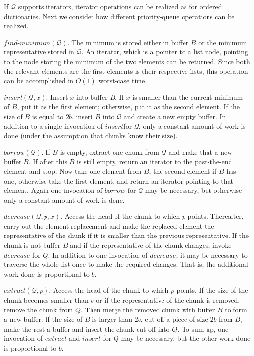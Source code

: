 \documentclass{DIKU-article}
\newcommand{\Findmin}{\mbox{$\mathit{find}$\textnormal{-}}\allowbreak{}\mbox{$\mathit{minimum}$}}
\newcommand{\Insert}{\mbox{$\mathit{insert}$}}
\newcommand{\Extract}{\mbox{$\mathit{extract}$}}
\newcommand{\Decrease}{\mbox{$\mathit{decrease}$}}
\newcommand{\Borrow}{\mbox{$\mathit{borrow}$}}
\begin{document}
If $\mathcal{Q}$ supports
iterators, iterator operations can be realized as for ordered
dictionaries.  Next we consider how different priority-queue
operations can be realized.

\Findmin{}$(\mathcal{Q})$. The minimum is stored either in buffer $B$ or the
minimum representative stored in $\mathcal{Q}$. An iterator, which is a pointer to a list
node, pointing to the node storing the minimum of the two elements can
be returned. Since both the relevant elements are the first elements
is their respective lists, this operation can be accomplished in
$O(1)$ worst-case time.

\Insert{}$(\mathcal{Q}, x)$. Insert $x$ into buffer $B$. If $x$ is smaller than
the current minimum of $B$, put it as the first element; otherwise, put it as
the second element. If the size of $B$ is equal to $2b$, insert
$B$ into $\mathcal{Q}$ and create a new empty buffer. In addition to a single
invocation of \Insert for $\mathcal{Q}$, only a constant amount of
work is done (under the assumption that chunks know their size).

\Borrow{}$(\mathcal{Q})$. If $B$ is empty, extract one chunk from
$\mathcal{Q}$ and make that a new buffer $B$. If after this $B$ is
still empty, return an iterator to the past-the-end element and
stop. Now take one element from $B$, the second element if $B$ has
one, otherwise take the first element, and return an iterator pointing
to that element. Again one invocation of \Borrow{} for $\mathcal{Q}$
may be necessary, but otherwise only a constant amount of work is
done.

\Decrease{}$(\mathcal{Q}, p, x)$. Access the head of the chunk to
which $p$ points. Thereafter, carry out the element replacement and
make the replaced element the representative of the chunk if it is
smaller than the previous representative. If the chunk is not buffer
$B$ and if the representative of the chunk changes, invoke
\Decrease{} for $Q$. In addition to one invocation of \Decrease{}, it
may be necessary to traverse the
whole list once to make the required changes. That is, the additional
work done is proportional to $b$.

\Extract{}$(\mathcal{Q}, p)$. Access the head of the chunk to which
$p$ points. If the size of the chunk becomes smaller than $b$ or if
the representative of the chunk is removed, remove the chunk from
$Q$. Then merge the removed chunk with buffer $B$ to form a new
buffer. If the size of $B$ is larger than $2b$, cut off a piece of
size $2b$ from $B$, make the rest a buffer and insert the chunk cut
off into $Q$. To sum up, one invocation of \Extract{} and \Insert{} for
$Q$ may be necessary, but the other work done is proportional to $b$.
\end{document}
